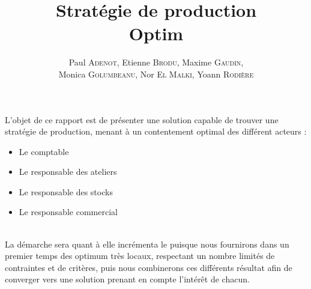 \documentclass[a4paper,11pt]{article}
\title{\textbf{Stratégie de production}\\Optim}
\author{Paul \textsc{Adenot}, Etienne \textsc{Brodu}, Maxime \textsc{Gaudin},\\
Monica \textsc{Golumbeanu}, Nor \textsc{El Malki}, Yoann \textsc{Rodière}}
\begin{document}
\maketitle
\newpage

\vspace*{\fill}
\tableofcontents 
\vspace*{\fill}
\newpage

\begin{nAbstract}
L'objet de ce rapport est de présenter une solution capable de trouver une
stratégie de production, menant à un contentement optimal des différent
acteurs :
\begin{itemize}
  \item Le comptable
  \item Le responsable des ateliers
  \item Le responsable des stocks
  \item Le responsable commercial
\end{itemize}
~\\
La démarche sera quant à elle incrémenta le puisque nous fournirons dans un
premier temps des optimum très locaux, respectant un nombre limités de
contraintes et de critères, puis nous combinerons ces différents résultat afin
de converger vers une solution prenant en compte l'intérêt de chacun.
\end{nAbstract}






\newpage


\graphicspath{{../SourcesMatlab/}}
\graphicspath{{.}}
\end{document}
